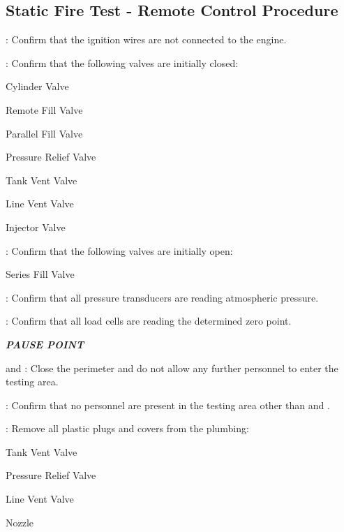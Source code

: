 \subsection{Static Fire Test - Remote Control Procedure}
\begin{checklist}
    \item \secondary: Confirm that the ignition wires are not connected to the engine.
    \item \primary{}: Confirm that the following valves are initially closed:
    \begin{checklist}
        \item Cylinder Valve
        \item Remote Fill Valve
        \item Parallel Fill Valve
        \item Pressure Relief Valve
        \item Tank Vent Valve
        \item Line Vent Valve
        \item Injector Valve
    \end{checklist}
    \item \primary{}: Confirm that the following valves are initially open:
    \begin{checklist}
        \item Series Fill Valve
    \end{checklist}
    \item \daq{}: Confirm that all pressure transducers are reading atmospheric pressure.
    \item \daq{}: Confirm that all load cells are reading the determined zero point.
    \item \textbf{\textit{PAUSE POINT}}
    \item \peri{} and \perii{}: Close the perimeter and do not allow any further personnel to enter the testing area.
    \item \secondary: Confirm that no personnel are present in the testing area other than \primary{} and \secondary.
    \item \primary: Remove all plastic plugs and covers from the plumbing:
    \begin {checklist}
        \item Tank Vent Valve
        \item Pressure Relief Valve
        \item Line Vent Valve
        \item Nozzle
    \end {checklist}

\end{checklist}
